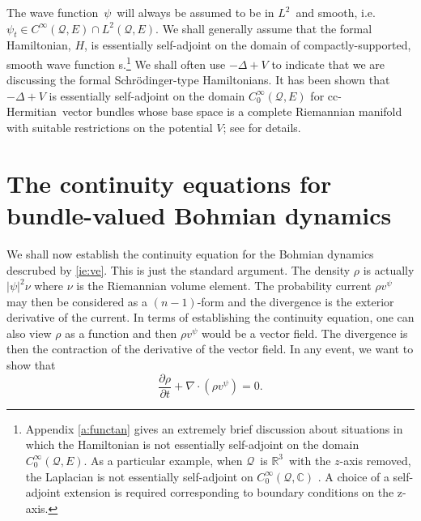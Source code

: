 \documentclass[11pt]{article}
\theoremstyle{remark}
\begin{document}
The wave function\ \ensuremath{\psi}\ will always be assumed to be in \ensuremath{L^{2}}\ and  smooth, 
i.e.\ $\ensuremath{\psi}_t \in
C^{\infty}(\ensuremath{\mathcal{Q}}, E) \cap \ensuremath{L^{2}}(\ensuremath{\mathcal{Q}}, E)$.
We shall generally assume that the formal
Hamiltonian, $H$, is essentially 
self-adjoint on the domain of compactly-supported, smooth wave function
s.\footnote{Appendix \ref{a:functan}
 gives an extremely brief discussion about
situations in which 
the Hamiltonian is not essentially self-adjoint on
the domain $C_0^{\infty} (\ensuremath{\mathcal{Q}}, E)$. 
As a particular example, when \ensuremath{\mathcal{Q}}\ is \ensuremath{\mathbb{R}^{3}}\ with
the $z$-axis  removed, the
Laplacian is not essentially self-adjoint on 
$C_0^{\infty}(\ensuremath{\mathcal{Q}}, \ensuremath{\mathbb{C}})$ \cite{AT98}. A choice of a self-adjoint
extension is required corresponding to boundary conditions on the z-axis.


} We shall often use $-\ensuremath{\Delta} +V$ to indicate that we are discussing
the formal Schr\"odinger-type Hamiltonians.
It has been shown that
$-\ensuremath{\Delta} +V$ is essentially self-adjoint on the domain $\ensuremath{C^{\infty}_0}(\ensuremath{\mathcal{Q}}, E)$
 for cc-Hermitian\ vector bundles whose base space
is a complete Riemannian manifold with suitable restrictions on the 
potential $V$;
see \cite{Sh01, Le00} for details. 

\section{The continuity equations for bundle-valued Bohmian dynamics}


We shall now establish the continuity equation for the Bohmian dynamics
descrubed by \eqref{ie:ve}. This is just the standard argument.
The density $\ensuremath{\rho}$ is actually $\ensuremath{\lvert {\ensuremath{\psi}} \rvert}^2 \nu$ where $\nu$ is the
Riemannian volume element. The probability current $\ensuremath{\rho} v^{\ensuremath{\psi}}$ may then be
considered as a $(n-1)$-form and the divergence is the exterior
derivative of the current. In terms of establishing the continuity
equation, 
one can also view $\ensuremath{\rho}$ as a function and then $\ensuremath{\rho} v^{\ensuremath{\psi}}$ would be
a vector field. The divergence is then the contraction of the
derivative of the vector
field. In any event, we want to show that      
\[
\ensuremath{\frac{\partial {\ensuremath{\rho}}}{\partial {t}}} + \nabla \cdot (\ensuremath{\rho} v^{ \ensuremath{\psi}}) = 0.
\]
\end{document}
